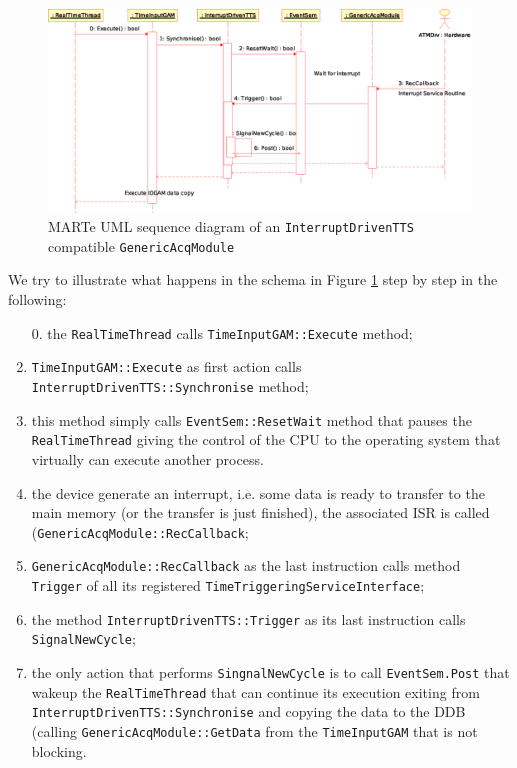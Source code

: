 \begin{figure}[h!]
 \begin{center}
  \includegraphics[width=\textwidth]{MARTe/InterruptDrivenTTS.eps}
  \caption{MARTe UML sequence diagram of an \texttt{InterruptDrivenTTS} compatible \texttt{GenericAcqModule} }
  \label{f:MARTe:GACQM:InterruptDrivenTTS}
 \end{center}
\end{figure}

We try to illustrate what happens in the schema in Figure \ref{f:MARTe:GACQM:InterruptDrivenTTS} step by step in the following:

\begin{enumerate}
 \item[0.] the \texttt{RealTimeThread} calls \texttt{TimeInputGAM::Execute} method;
 \item \texttt{TimeInputGAM::Execute} as first action calls \texttt{InterruptDrivenTTS::Synchronise} method;
 \item this method simply calls \texttt{EventSem::ResetWait} method that pauses the \texttt{RealTimeThread} giving the control of the CPU to the operating system that virtually can execute another process.
 \item the device generate an interrupt, i.e. some data is ready to transfer to the main memory (or the transfer is just finished), the associated ISR is called (\texttt{GenericAcqModule::RecCallback};
 \item \texttt{GenericAcqModule::RecCallback} as the last instruction calls method \texttt{Trigger} of all its registered \texttt{TimeTriggeringServiceInterface};
 \item the method \texttt{InterruptDrivenTTS::Trigger} as its last instruction calls \texttt{SignalNewCycle};
 \item the only action that performs \texttt{SingnalNewCycle} is to call \texttt{EventSem.Post} that wakeup the \texttt{RealTimeThread} that can continue its execution exiting from \texttt{InterruptDrivenTTS::Synchronise} and copying the data to the DDB (calling \texttt{GenericAcqModule::GetData} from the \texttt{TimeInputGAM} that is not blocking.
\end{enumerate}

